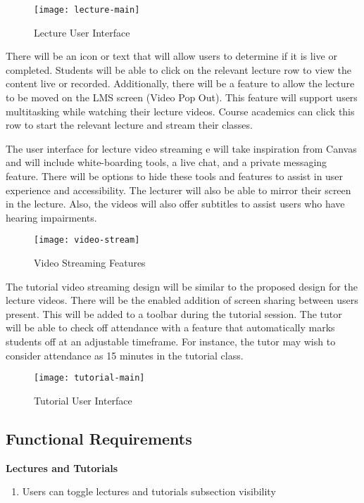 \begin{figure}[h!]
    \centering
    \texttt{[image: lecture-main]}
    \caption{Lecture User Interface}
\end{figure}

There will be an icon or text that will allow users to determine if it is live or completed. Students will be able to click on the relevant lecture row to view the 
content live or recorded. Additionally, there will be a feature to allow the lecture to be moved on the LMS screen (Video Pop Out). This feature will support users 
multitasking while watching their lecture videos. Course academics can click this row to start the relevant lecture and stream their classes. 

The user interface for lecture video streaming e will take inspiration from Canvas and will include white-boarding tools, a live chat, and a private messaging feature. There will be 
options to hide these tools and features to assist in user experience and accessibility. The lecturer will also be able to mirror their screen in the lecture. Also, the 
videos will also offer subtitles to assist users who have hearing impairments. 

\begin{figure}[h!]
  \centering
  \texttt{[image: video-stream]}
  \caption{Video Streaming Features}
\end{figure}

\newpage
The tutorial video streaming design will be similar to the proposed design for the lecture videos. There will be the enabled addition of screen sharing between users present. 
This will be added to a toolbar during the tutorial session. The tutor will be able to check off attendance with a feature that automatically marks students 
off at an adjustable timeframe. For instance, the tutor may wish to consider attendance as 15 minutes in the tutorial class. 

\begin{figure}[h!]
    \centering
    \texttt{[image: tutorial-main]}
    \caption{Tutorial User Interface}
\end{figure}
\newpage


\subsection{Functional Requirements}

\textbf{Lectures and Tutorials}
    \begin{enumerate}
    \item Users can toggle lectures and tutorials subsection visibility
    \end{enumerate}

